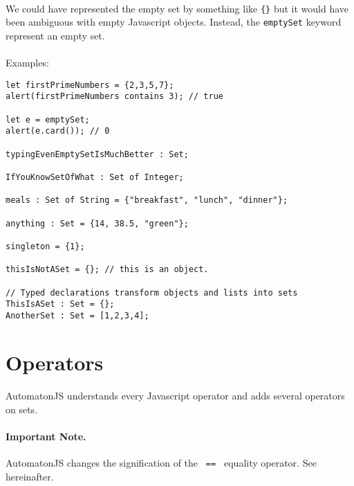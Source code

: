 \documentclass{article}
\begin{document}
\begin{sloppypar}
      
\paragraph{}
We could have represented the empty set by something like \lstinline!{}! but it would have been ambiguous with empty Javascript objects. Instead, the \lstinline!emptySet! keyword represent an empty set.

      
\paragraph{}
Examples:

{\begin{lstlisting}
let firstPrimeNumbers = {2,3,5,7};
alert(firstPrimeNumbers contains 3); // true

let e = emptySet;
alert(e.card()); // 0

typingEvenEmptySetIsMuchBetter : Set;

IfYouKnowSetOfWhat : Set of Integer;

meals : Set of String = {"breakfast", "lunch", "dinner"};

anything : Set = {14, 38.5, "green"};

singleton = {1};

thisIsNotASet = {}; // this is an object.

// Typed declarations transform objects and lists into sets
ThisIsASet : Set = {};
AnotherSet : Set = [1,2,3,4];
\end{lstlisting}
}

   




\section{ Operators}


\paragraph{}
AutomatonJS understands every Javascript operator and adds several operators on sets.
   
   \paragraph{Important Note. } AutomatonJS changes the signification of the \lstinline! == ! equality operator. See hereinafter.

   


\end{sloppypar}
\end{document}
